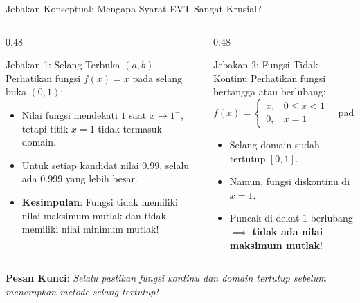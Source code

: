 \documentclass[aspectratio=169,10pt]{beamer}
\begin{document}
\begin{frame}{Jebakan Konseptual: Mengapa Syarat EVT Sangat Krusial?}
    \begin{columns}[T]
        \begin{column}{0.48\textwidth}
            \begin{alertblock}{Jebakan 1: Selang Terbuka $(a, b)$}
                Perhatikan fungsi $f(x) = x$ pada selang buka $(0, 1)$:
                \begin{itemize}
                    \item Nilai fungsi mendekati $1$ saat $x \to 1^-$, tetapi titik $x = 1$ tidak termasuk domain.
                    \item Untuk setiap kandidat nilai $0.99$, selalu ada $0.999$ yang lebih besar.
                    \item \textbf{Kesimpulan}: Fungsi tidak memiliki nilai maksimum mutlak dan tidak memiliki nilai minimum mutlak!
                \end{itemize}
            \end{alertblock}
        \end{column}

        \begin{column}{0.48\textwidth}
            \begin{alertblock}{Jebakan 2: Fungsi Tidak Kontinu}
                Perhatikan fungsi bertangga atau berlubang:
                \[
                    f(x) = \begin{cases} 
                        x, & 0 \le x < 1 \\ 
                        0, & x = 1 
                    \end{cases} \quad \text{pada } [0, 1]
                \]
                \begin{itemize}
                    \item Selang domain sudah tertutup $[0, 1]$.
                    \item Namun, fungsi diskontinu di $x = 1$.
                    \item Puncak di dekat $1$ berlubang $\implies$ \textbf{tidak ada nilai maksimum mutlak}!
                \end{itemize}
            \end{alertblock}
        \end{column}
    \end{columns}

    \vspace{0.15cm}
    \centering
    {\small \textbf{Pesan Kunci}: \textit{Selalu pastikan fungsi kontinu dan domain tertutup sebelum menerapkan metode selang tertutup!}}
\end{frame}
\end{document}
